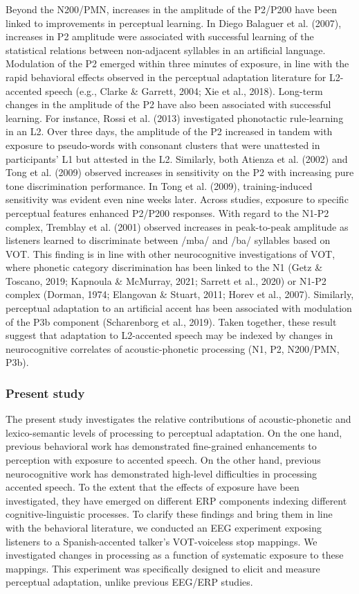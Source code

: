\documentclass[
  12pt,
  twoside]{article}
\begin{document}
Beyond the N200/PMN, increases in the amplitude of the P2/P200 have been linked to improvements in perceptual learning.
In Diego Balaguer et al. (2007), increases in P2 amplitude were associated with successful learning of the statistical relations between non-adjacent syllables in an artificial language.
Modulation of the P2 emerged within three minutes of exposure, in line with the rapid behavioral effects observed in the perceptual adaptation literature for L2-accented speech (e.g., Clarke \& Garrett, 2004; Xie et al., 2018).
Long-term changes in the amplitude of the P2 have also been associated with successful learning.
For instance, Rossi et al. (2013) investigated phonotactic rule-learning in an L2.
Over three days, the amplitude of the P2 increased in tandem with exposure to pseudo-words with consonant clusters that were unattested in participants' L1 but attested in the L2.
Similarly, both Atienza et al. (2002) and Tong et al. (2009) observed increases in sensitivity on the P2 with increasing pure tone discrimination performance.
In Tong et al. (2009), training-induced sensitivity was evident even nine weeks later.
Across studies, exposure to specific perceptual features enhanced P2/P200 responses.
With regard to the N1-P2 complex, Tremblay et al. (2001) observed increases in peak-to-peak amplitude as listeners learned to discriminate between /mba/ and /ba/ syllables based on VOT.
This finding is in line with other neurocognitive investigations of VOT, where phonetic category discrimination has been linked to the N1 (Getz \& Toscano, 2019; Kapnoula \& McMurray, 2021; Sarrett et al., 2020) or N1-P2 complex (Dorman, 1974; Elangovan \& Stuart, 2011; Horev et al., 2007).
Similarly, perceptual adaptation to an artificial accent has been associated with modulation of the P3b component (Scharenborg et al., 2019).
Taken together, these result suggest that adaptation to L2-accented speech may be indexed by changes in neurocognitive correlates of acoustic-phonetic processing (N1, P2, N200/PMN, P3b).

\hypertarget{present-study-1}{%
\subsubsection{Present study}\label{present-study-1}}

The present study investigates the relative contributions of acoustic-phonetic and lexico-semantic levels of processing to perceptual adaptation.
On the one hand, previous behavioral work has demonstrated fine-grained enhancements to perception with exposure to accented speech.
On the other hand, previous neurocognitive work has demonstrated high-level difficulties in processing accented speech.
To the extent that the effects of exposure have been investigated, they have emerged on different ERP components indexing different cognitive-linguistic processes.
To clarify these findings and bring them in line with the behavioral literature, we conducted an EEG experiment exposing listeners to a Spanish-accented talker's VOT-voiceless stop mappings.
We investigated changes in processing as a function of systematic exposure to these mappings.
This experiment was specifically designed to elicit and measure perceptual adaptation, unlike previous EEG/ERP studies.
\end{document}
